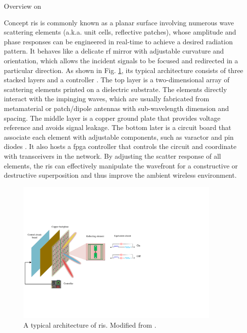 \begin{section}{Overview on }
	\begin{subsection}{Concept}
		\gls{ris} is commonly known as a planar surface involving numerous wave scattering elements (a.k.a. unit cells, reflective patches), whose amplitude and phase responses can be engineered in real-time to achieve a desired radiation pattern.
		It behaves like a delicate \gls{rf} mirror with adjustable curvature and orientation, which allows the incident signals to be focused and redirected in a particular direction.
		As shown in Fig. \ref{fg:ris_architecture}, its typical architecture consists of three stacked layers and a controller \cite{Wu2020}.
		The top layer is a two-dimensional array of scattering elements printed on a dielectric substrate.
		The elements directly interact with the impinging waves, which are usually fabricated from metamaterial or patch/dipole antennas with sub-wavelength dimension and spacing.
		The middle layer is a copper ground plate that provides voltage reference and avoids signal leakage.
		The bottom later is a circuit board that associate each element with adjustable components, such as varactor and \gls{pin} diodes \cite{Dai2020}.
		It also hosts a \gls{fpga} controller that controls the circuit and coordinate with transceivers in the network.
		By adjusting the scatter response of all elements, the \gls{ris} can effectively manipulate the wavefront for a constructive or destructive superposition and thus improve the ambient wireless environment.
		\begin{figure}
			\centering
			\includegraphics[width=0.9\textwidth]{ris_architecture.pdf}
			\caption{A typical architecture of \gls{ris}. Modified from \cite{Wu2020}.}
			\label{fg:ris_architecture}
		\end{figure}
	\end{subsection}


\end{section}
